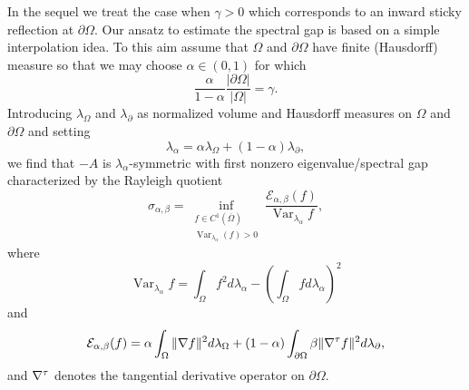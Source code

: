 \documentclass[a4paper]{article}
\theoremstyle{definition}
\DeclareMathOperator{\Var}{Var}
\numberwithin{equation}{section}
\begin{document}
In the sequel we treat the case when $\gamma > 0$ which corresponds to an inward sticky reflection at $\partial \Omega$. Our ansatz to estimate the spectral gap is based on a simple interpolation idea. To this aim assume that $\Omega$ and $\partial \Omega$ have finite (Hausdorff) measure so that we may choose   $\alpha \in (0,1)$ for which
\[ \frac \alpha {1-\alpha} \frac{|\partial \Omega|}{|\Omega|}=\gamma.\]
Introducing $\lambda_\Omega$ and $\lambda_\partial$
as normalized volume and Hausdorff measures on $\Omega$ and $\partial \Omega$ and  setting 
\[
\lambda_\alpha = \alpha \lambda_\Omega + (1-\alpha) \lambda_\partial,\]
we find that  $-A$ is $\lambda_\alpha$-symmetric with first nonzero eigenvalue/spectral gap characterized by the Rayleigh quotient 
\[ \sigma_{\alpha,\beta} = \inf_{\substack{f \in C^1 (\overline \Omega)\\ \Var_{\lambda_\alpha}(f)>0}} \frac{\mathcal E_{\alpha, \beta}(f)}{\Var_{\lambda_\alpha}f},\]
where 
\[ \Var_{\lambda_\alpha}f =\int_\Omega f^2d\lambda_\alpha-\left(\int_\Omega fd\lambda_\alpha\right)^2\]
and 
\[ \mathcal E_{\alpha, \beta}(f) = \alpha \int_{\Omega} \|\nabla f\|^2 d \lambda_\Omega + (1- \alpha)  \int_{\partial \Omega} \beta \|\nabla^\tau f\|^2 d \lambda_\partial, \]
 and $\nabla^\tau$ denotes the tangential derivative operator on $\partial \Omega$.  
 
\end{document}
